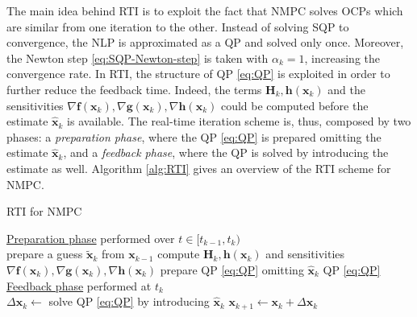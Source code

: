 The main idea behind RTI is to exploit the fact that NMPC solves OCPs which 
are similar from one iteration to the other. Instead of solving SQP to convergence,
the NLP is approximated as a QP and solved only once. Moreover, the Newton step
\eqref{eq:SQP-Newton-step} is taken with $\alpha_k=1$, increasing the convergence
rate. In RTI, the structure of QP \eqref{eq:QP} is exploited in order to further
reduce the feedback time. Indeed, the terms $\bm{H}_k, \bm{h}(\bm{x}_k)$
and the sensitivities $\nabla \bm{f}(\bm{x}_k), \nabla \bm{g}({\bm{x}_k}), \nabla \bm{h}({\bm{x}_k})$
could be computed before the estimate $\hat{\bm{x}}_k$ is available. The real-time
iteration scheme is, thus, composed by two phases: a \textit{preparation phase},
where the QP \eqref{eq:QP} is prepared omitting the estimate $\hat{\bm{x}}_k$, and a 
\textit{feedback phase}, where the QP is solved by introducing the estimate as well.
Algorithm \ref{alg:RTI} gives an overview of the RTI scheme for NMPC.

\begin{algorithm}
	\small
	\caption{RTI for NMPC}
	\label{alg:RTI}
    \nonl \underline{Preparation phase} performed over $t \in [t_{k-1}, t_k)$\\
    prepare a guess $\tilde{\bm{x}}_k$ from $\bm{x}_{k-1}$ \;
    compute $\bm{H}_k, \bm{h}(\bm{x}_k)$ and sensitivities $\nabla \bm{f}(\bm{x}_k), \nabla \bm{g}({\bm{x}_k}), \nabla \bm{h}({\bm{x}_k})$\;
    prepare QP \eqref{eq:QP} omitting $\hat{\bm{x}}_k$\;
    \Return{} QP \eqref{eq:QP}\;
    \BlankLine
    \nonl \underline{Feedback phase} performed at $t_k$\\
    $\Delta \bm{x}_{k} \leftarrow$ solve QP \eqref{eq:QP} by introducing $\hat{\bm{x}}_k$\;
    $\bm{x}_{k+1} \leftarrow \bm{x}_k + \Delta \bm{x}_k$\;
    \;
\end{algorithm}
